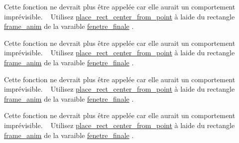 
\begin{DoxyRefList}
\item[Membre \mbox{\hyperlink{affichage_8h_a5911c692b804289a22f5a161b4fe2286}{deplacer\+\_\+texture\+\_\+centre}} (t\+\_\+aff $\ast$texture, int x, int y)]\label{deprecated__deprecated000001}%
%
Cette fonction ne devrait plus être appelée car elle aurait un comportement imprévisible. ~\newline
 Utilisez \mbox{\hyperlink{affichage_8h_a26cf1d2055162e3bf7166de2f55902f9}{place\+\_\+rect\+\_\+center\+\_\+from\+\_\+point}} à l\textquotesingle{}aide du rectangle \mbox{\hyperlink{structs__aff_aefd6b2f2f56383a8cba0193ff88593dc}{frame\+\_\+anim}} de la varaible \mbox{\hyperlink{affichage_8h_aef49d39125567f1a9d5ed0561ea60edc}{fenetre\+\_\+finale}} . 
\item[Membre \mbox{\hyperlink{affichage_8h_a508ce5ebec0cacf99a3bbddd33d6880f}{rect\+\_\+centre}} (S\+D\+L\+\_\+\+Rect $\ast$rectangle)]\label{deprecated__deprecated000004}%
%
Cette fonction ne devrait plus être appelée car elle aurait un comportement imprévisible. ~\newline
 Utilisez \mbox{\hyperlink{affichage_8h_a26cf1d2055162e3bf7166de2f55902f9}{place\+\_\+rect\+\_\+center\+\_\+from\+\_\+point}} à l\textquotesingle{}aide du rectangle \mbox{\hyperlink{structs__aff_aefd6b2f2f56383a8cba0193ff88593dc}{frame\+\_\+anim}} de la varaible \mbox{\hyperlink{affichage_8h_aef49d39125567f1a9d5ed0561ea60edc}{fenetre\+\_\+finale}} . 
\item[Membre \mbox{\hyperlink{affichage_8h_a6bd4bd87195563a7315afb0fda7fe6d7}{rect\+\_\+centre\+\_\+x}} (S\+D\+L\+\_\+\+Rect $\ast$rectangle)]\label{deprecated__deprecated000002}%
%
Cette fonction ne devrait plus être appelée car elle aurait un comportement imprévisible. ~\newline
 Utilisez \mbox{\hyperlink{affichage_8h_a26cf1d2055162e3bf7166de2f55902f9}{place\+\_\+rect\+\_\+center\+\_\+from\+\_\+point}} à l\textquotesingle{}aide du rectangle \mbox{\hyperlink{structs__aff_aefd6b2f2f56383a8cba0193ff88593dc}{frame\+\_\+anim}} de la varaible \mbox{\hyperlink{affichage_8h_aef49d39125567f1a9d5ed0561ea60edc}{fenetre\+\_\+finale}} . 
\item[Membre \mbox{\hyperlink{affichage_8h_adfcad3e29121806faaa438925ed845ab}{rect\+\_\+centre\+\_\+y}} (S\+D\+L\+\_\+\+Rect $\ast$rectangle)]\label{deprecated__deprecated000003}%
%
Cette fonction ne devrait plus être appelée car elle aurait un comportement imprévisible. ~\newline
 Utilisez \mbox{\hyperlink{affichage_8h_a26cf1d2055162e3bf7166de2f55902f9}{place\+\_\+rect\+\_\+center\+\_\+from\+\_\+point}} à l\textquotesingle{}aide du rectangle \mbox{\hyperlink{structs__aff_aefd6b2f2f56383a8cba0193ff88593dc}{frame\+\_\+anim}} de la varaible \mbox{\hyperlink{affichage_8h_aef49d39125567f1a9d5ed0561ea60edc}{fenetre\+\_\+finale}} .
\end{DoxyRefList}